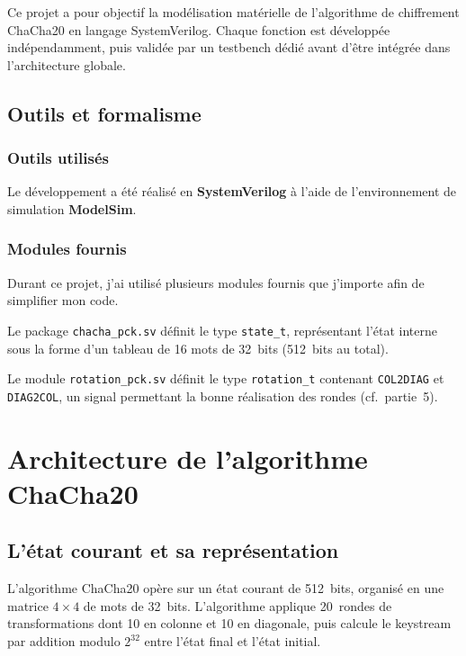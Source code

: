 \documentclass[12pt, a4paper]{article}
\newcommand{\signal}[1]{\texttt{#1}}
\newcommand{\module}[1]{\texttt{\textcolor{maincolor}{#1}}}
\begin{document}
Ce projet a pour objectif la modélisation matérielle de l'algorithme de chiffrement ChaCha20 en
langage SystemVerilog. Chaque fonction est développée indépendamment, puis validée par un
testbench dédié avant d'être intégrée dans l'architecture globale.

\subsection{Outils et formalisme}

\subsubsection{Outils utilisés}

Le développement a été réalisé en \textbf{SystemVerilog} à l'aide de l'environnement de
simulation \textbf{ModelSim}.

\subsubsection{Modules fournis}

Durant ce projet, j'ai utilisé plusieurs modules fournis que j'importe afin de simplifier
mon code.

Le package \module{chacha\_pck.sv} définit le type \signal{state\_t}, représentant l'état
interne sous la forme d'un tableau de 16 mots de 32~bits (512~bits au total).

Le module \module{rotation\_pck.sv} définit le type \signal{rotation\_t} contenant
\signal{COL2DIAG} et \signal{DIAG2COL}, un signal permettant la bonne réalisation des rondes
(cf.\ partie~5).

\section{Architecture de l'algorithme ChaCha20}

\subsection{L'état courant et sa représentation}

L'algorithme ChaCha20 opère sur un état courant de 512~bits, organisé en une matrice $4\times4$
de mots de 32~bits. L'algorithme applique 20~rondes de transformations dont 10 en colonne et
10 en diagonale, puis calcule le keystream par addition modulo $2^{32}$ entre l'état final et
l'état initial.
\end{document}
